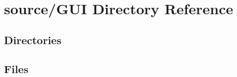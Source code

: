 \section{source/\+G\+UI Directory Reference}
\label{dir_ac55d9916c98013834a26fdee4c9b6ad}
\subsection*{Directories}
\begin{DoxyCompactItemize}
\end{DoxyCompactItemize}
\subsection*{Files}
\begin{DoxyCompactItemize}
\end{DoxyCompactItemize}
